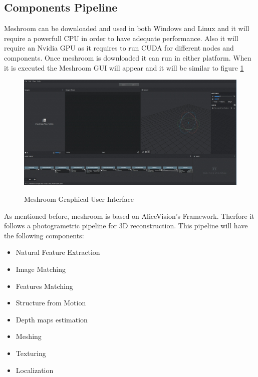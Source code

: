 \documentclass[12pt]{report}
\begin{document}
\subsection*{Components Pipeline}
Meshroom can be downloaded and used in both Windows and Linux and it will require a powerfull CPU in order to have adequate performance. Also it will require an Nvidia GPU as it requires to run CUDA for different nodes and components.
Once meshroom is downloaded it can run in either platform. When it is executed the Meshroom GUI will appear and it will be similar to figure \ref{fig:meshroom_gui}

\begin{figure}[h]
  \centering
  \includegraphics[width=1\textwidth]{meshroom_gui.jpg}
  \caption{Meshroom Graphical User Interface}\cite[]{meshroom}
  \label{fig:meshroom_gui} 
\end{figure}

\newpage
As mentioned before, meshroom is based on AliceVision's Framework. Therfore it follows a photogrametric pipeline for 3D reconstruction. 
This pipeline will have the following components:
\begin{itemize}
  \itemsep0em 
  \item Natural Feature Extraction
  \item Image Matching
  \item Features Matching
  \item Structure from Motion
  \item Depth maps estimation
  \item Meshing
  \item Texturing
  \item Localization
\end{itemize}
\end{document}
